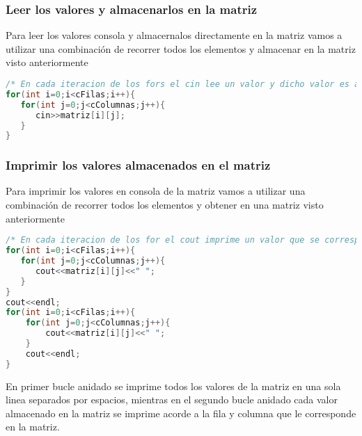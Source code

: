 \subsubsection{Leer los valores y almacenarlos en la matriz}

Para leer los valores consola y almacernalos directamente en la matriz vamos a utilizar una combinación de recorrer todos los elementos y almacenar en la matriz visto anteriormente

\begin{lstlisting}[language=C++]
/* En cada iteracion de los fors el cin lee un valor y dicho valor es almacenado en la matriz en la posicion que indique el valor de las variable i y j en esa iteracion, en la primera el valor seria (0;0), en la segunda (0;1) y asi sucesivamente. Tener en cuenta que los valores de i esten en rango de posiciones validas de la filas y la j en el rango de posiciones validas de la columnas de la matriz */
for(int i=0;i<cFilas;i++){
   for(int j=0;j<cColumnas;j++){
      cin>>matriz[i][j];
   }		
}
\end{lstlisting}

\subsubsection{Imprimir los valores almacenados en el matriz}

Para imprimir los valores en consola de la matriz vamos a utilizar una combinación de recorrer todos los elementos y obtener en una matriz visto anteriormente

\begin{lstlisting}[language=C++]
/* En cada iteracion de los for el cout imprime un valor que se corresponde con el almacenado en la matriz en la posicion que indique el valor de las variables i (fila) y j (columna)  en esa iteracion, en la primera el valor seria (0;0), en la segunda (0;1) y asi sucesivamente. Tener en cuenta que los valores de i esten en rango de posiciones validas de la filas y la j en el rango de posiciones validas de la columnas de la matriz*/
for(int i=0;i<cFilas;i++){
   for(int j=0;j<cColumnas;j++){
      cout<<matriz[i][j]<<" ";
   }
} 
cout<<endl;
for(int i=0;i<cFilas;i++){
	for(int j=0;j<cColumnas;j++){
		cout<<matriz[i][j]<<" ";
	}
    cout<<endl;
}
\end{lstlisting}

En primer bucle anidado se imprime todos los valores de la matriz en una sola linea separados por espacios, mientras en el segundo bucle anidado cada valor almacenado en la matriz  se imprime acorde a la fila y columna que le corresponde en la matriz.

